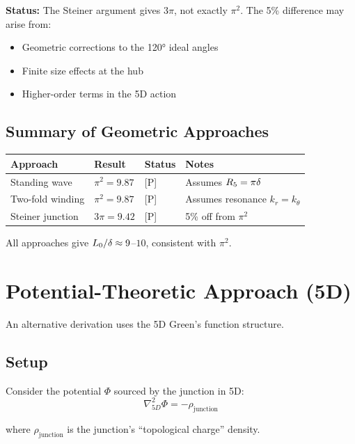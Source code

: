 \textbf{Status:} The Steiner argument gives $3\pi$, not exactly $\pi^2$. The
5\% difference may arise from:
\begin{itemize}
    \item Geometric corrections to the 120° ideal angles
    \item Finite size effects at the hub
    \item Higher-order terms in the 5D action
\end{itemize}

\subsection{Summary of Geometric Approaches}

\begin{center}
\begin{tabular}{llll}
\toprule
Approach & Result & Status & Notes \\
\midrule
Standing wave & $\pi^2 = 9.87$ & [P] & Assumes $R_5 = \pi\delta$ \\
Two-fold winding & $\pi^2 = 9.87$ & [P] & Assumes resonance $k_r = k_\theta$ \\
Steiner junction & $3\pi = 9.42$ & [P] & 5\% off from $\pi^2$ \\
\bottomrule
\end{tabular}
\end{center}

All approaches give $L_0/\delta \approx 9$--$10$, consistent with $\pi^2$.

\section{Potential-Theoretic Approach (5D)}
\label{sec:L0delta:potential}

An alternative derivation uses the 5D Green's function structure.

\subsection{Setup}

Consider the potential $\Phi$ sourced by the junction in 5D:
\begin{equation}
    \nabla^2_{5D} \Phi = -\rho_{\text{junction}}
\end{equation}

where $\rho_{\text{junction}}$ is the junction's ``topological charge'' density.

